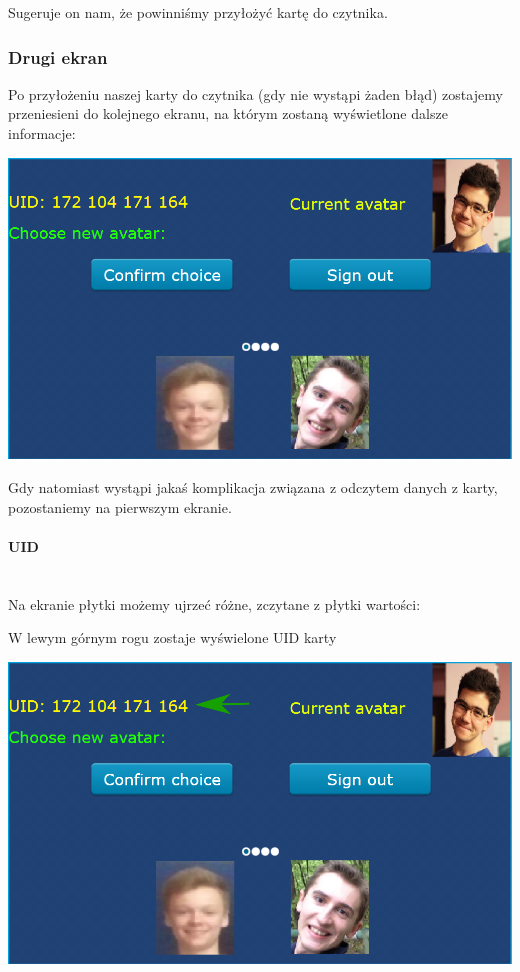 \documentclass[12pt,hidelinks]{article}
\newcommand{\subsubsubsection}[1]{\paragraph{#1}\mbox{}\\}
\begin{document}
    Sugeruje on nam, że powinniśmy przyłożyć kartę do czytnika.

    \newpage
    \subsubsection{Drugi ekran}
    Po przyłożeniu naszej karty do czytnika (gdy nie wystąpi żaden błąd) zostajemy przeniesieni do kolejnego ekranu, na którym zostaną wyświetlone dalsze informacje:

    \begin{center}
        \includegraphics[scale=0.75]{img/screen2.png}
    \end{center}

    Gdy natomiast wystąpi jakaś komplikacja związana z odczytem danych z karty, pozostaniemy na pierwszym ekranie.

    \newpage

    \subsubsubsection{UID}
    Na ekranie płytki możemy ujrzeć różne, zczytane z płytki wartości:

    W lewym górnym rogu zostaje wyświelone UID karty

    \begin{center}
        \includegraphics[scale=0.6]{img/screen2-highlighted-uid.png}
    \end{center}
\end{document}
